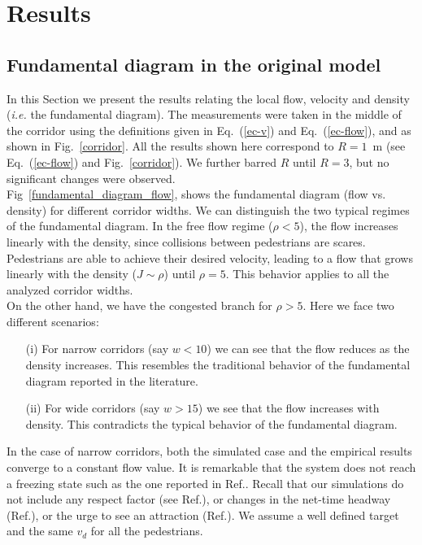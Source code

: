 \section{\label{results}Results}

\subsection{\label{fundamental_diagram} Fundamental diagram in the original model}

In this Section we present the results relating the local flow, velocity and density (\textit{i.e.} the fundamental diagram). The measurements were taken in the middle of the corridor using the definitions given in Eq.~(\ref{ec-v}) and Eq.~(\ref{ec-flow}), and as shown in Fig.~\ref{corridor}. All the results shown here correspond to $R=1$~m (see Eq.~(\ref{ec-flow}) and Fig.~\ref{corridor}). We further barred $R$ until $R=3$, but no significant changes were observed. \\

Fig~\ref{fundamental_diagram_flow}, shows the fundamental diagram (flow vs. density) for different corridor widths. We can distinguish the two typical regimes of the fundamental diagram. In the free flow regime ($\rho < 5$), the flow increases linearly with the density, since collisions between pedestrians are scares. Pedestrians are able to achieve their desired velocity, leading to a flow that grows linearly with the density ($J \sim \rho$) until $\rho=5$. This behavior applies to all the analyzed corridor widths.\\

On the other hand, we have the congested branch  for $\rho > 5$. Here we face two different scenarios:

\begin{itemize}
\item[(i)] For narrow corridors (say $w < 10$) we can see that the flow reduces as the density increases. This resembles the traditional behavior of the fundamental diagram reported in the literature. 
\item[(ii)] For wide corridors (say $w > 15$) we see that the flow increases with density. This contradicts the typical behavior of the fundamental diagram.   
\end{itemize}

In the case of narrow corridors, both the simulated case and the empirical results converge to a constant flow value. It is remarkable that the system does not reach a freezing state such as the one reported in Ref.\cite{kwak}. Recall that our simulations do not include any respect factor (see Ref.\cite{parisi2}), or changes in the net-time headway (Ref.\cite{helbing3}), or the urge to see an attraction (Ref.\cite{kwak}). We assume a well defined target and the same $v_d$ for all the pedestrians.\\


